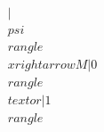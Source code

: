 \documentclass[preview]{standalone}
\begin{document}
\begin{align*}
|\\psi\\rangle \\xrightarrow{M} |0\\rangle \\text{ or } |1\\rangle
\end{align*}
\end{document}
